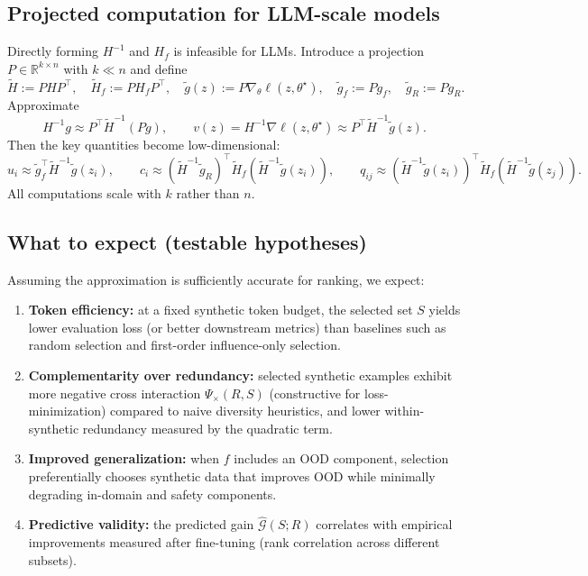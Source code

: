 \documentclass{article}
\theoremstyle{plain}
\theoremstyle{definition}
\theoremstyle{remark}
\begin{document}
\subsection{Projected computation for LLM-scale models}
Directly forming $H^{-1}$ and $H_f$ is infeasible for LLMs.
Introduce a projection $P\in\mathbb{R}^{k\times n}$ with $k\ll n$ and define
\[
\tilde{H} := P H P^\top,\quad \tilde{H}_f := P H_f P^\top,\quad \tilde{g}(z) := P\nabla_\theta \ell(z,\theta^\star),\quad \tilde{g}_f := P g_f,\quad \tilde{g}_R := P g_R.
\]
Approximate
\[
H^{-1}g \approx P^\top \tilde{H}^{-1}(P g),\qquad
v(z)=H^{-1}\nabla \ell(z,\theta^\star)\approx P^\top \tilde{H}^{-1}\tilde{g}(z).
\]
Then the key quantities become low-dimensional:
\[
u_i \approx \tilde{g}_f^\top \tilde{H}^{-1}\tilde{g}(z_i),
\qquad
c_i \approx (\tilde{H}^{-1}\tilde{g}_R)^\top \tilde{H}_f(\tilde{H}^{-1}\tilde{g}(z_i)),
\qquad
q_{ij} \approx (\tilde{H}^{-1}\tilde{g}(z_i))^\top \tilde{H}_f(\tilde{H}^{-1}\tilde{g}(z_j)).
\]
All computations scale with $k$ rather than $n$.

\subsection{What to expect (testable hypotheses)}
Assuming the approximation is sufficiently accurate for ranking, we expect:
\begin{enumerate}
  \item \textbf{Token efficiency:} at a fixed synthetic token budget, the selected set $S$ yields lower evaluation loss
  (or better downstream metrics) than baselines such as random selection and first-order influence-only selection.
  \item \textbf{Complementarity over redundancy:} selected synthetic examples exhibit more negative cross interaction
  $\Psi_{\times}(R,S)$ (constructive for loss-minimization) compared to naive diversity heuristics,
  and lower within-synthetic redundancy measured by the quadratic term.
  \item \textbf{Improved generalization:} when $f$ includes an OOD component, selection preferentially chooses synthetic data
  that improves OOD while minimally degrading in-domain and safety components.
  \item \textbf{Predictive validity:} the predicted gain $\widehat{\mathcal{G}}(S;R)$ correlates with empirical improvements
  measured after fine-tuning (rank correlation across different subsets).
\end{enumerate}
\end{document}
